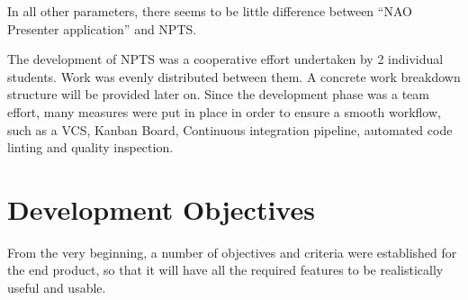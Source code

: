\documentclass[12pt, fleqn, a4paper]{article}
\begin{document}
In all other parameters, there seems to be little difference between \enquote{NAO Presenter application} and NPTS. \par
The development of NPTS was a cooperative effort undertaken by 2 individual students. Work was evenly distributed between them. A concrete work breakdown structure will be provided later on. Since the development phase was a team effort, many measures were put in place in order to ensure a smooth workflow, such as a VCS, Kanban Board, Continuous integration pipeline, automated code linting and quality inspection.
\section{Development Objectives}
From the very beginning, a number of objectives and criteria were established for the end product, so that it will have all the required features to be realistically useful and usable.
\end{document}
